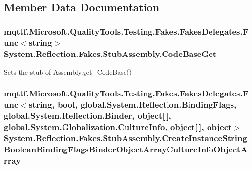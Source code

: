 \subsection{Member Data Documentation}
\hypertarget{class_system_1_1_reflection_1_1_fakes_1_1_stub_assembly_a93362f745ad0c349ef9ac66236d00a8e}{
\subsubsection[{Code\-Base\-Get}]{\setlength{\rightskip}{0pt plus 5cm}mqttf.\-Microsoft.\-Quality\-Tools.\-Testing.\-Fakes.\-Fakes\-Delegates.\-Func$<$string$>$ System.\-Reflection.\-Fakes.\-Stub\-Assembly.\-Code\-Base\-Get}}\label{class_system_1_1_reflection_1_1_fakes_1_1_stub_assembly_a93362f745ad0c349ef9ac66236d00a8e}


Sets the stub of Assembly.\-get\-\_\-\-Code\-Base()

\hypertarget{class_system_1_1_reflection_1_1_fakes_1_1_stub_assembly_a13316b45272a12be6b5f6039b1fdff94}{
\subsubsection[{Create\-Instance\-String\-Boolean\-Binding\-Flags\-Binder\-Object\-Array\-Culture\-Info\-Object\-Array}]{\setlength{\rightskip}{0pt plus 5cm}mqttf.\-Microsoft.\-Quality\-Tools.\-Testing.\-Fakes.\-Fakes\-Delegates.\-Func$<$string, bool, global.\-System.\-Reflection.\-Binding\-Flags, global.\-System.\-Reflection.\-Binder, object\mbox{[}$\,$\mbox{]}, global.\-System.\-Globalization.\-Culture\-Info, object\mbox{[}$\,$\mbox{]}, object$>$ System.\-Reflection.\-Fakes.\-Stub\-Assembly.\-Create\-Instance\-String\-Boolean\-Binding\-Flags\-Binder\-Object\-Array\-Culture\-Info\-Object\-Array}}\label{class_system_1_1_reflection_1_1_fakes_1_1_stub_assembly_a13316b45272a12be6b5f6039b1fdff94}


